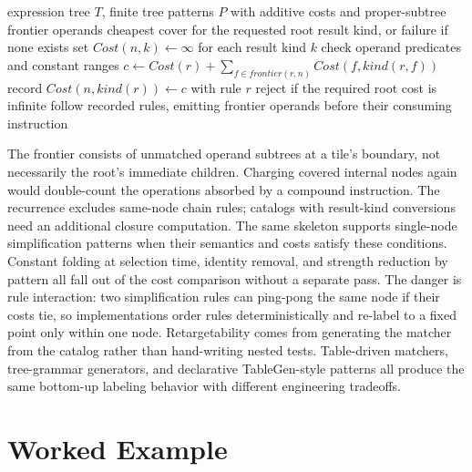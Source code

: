 \begin{algorithm}[htbp]
\caption{Tree-pattern instruction selection by dynamic programming}\label{alg:ch25-tree-dp}
\begin{pseudocode}
\Require expression tree $T$, finite tree patterns $P$ with additive costs and proper-subtree frontier operands
\Ensure cheapest cover for the requested root result kind, or failure if none exists
\State set $Cost(n, k) \gets \infty$ for each result kind $k$
\State check operand predicates and constant ranges
\State $c \gets Cost(r) + \sum_{f\in frontier(r,n)} Cost(f, kind(r,f))$
\State record $Cost(n, kind(r)) \gets c$ with rule $r$
\EndIf
\EndFor
\EndFor
\State reject if the required root cost is infinite
\State follow recorded rules, emitting frontier operands before their consuming instruction
\end{pseudocode}
\end{algorithm}

The frontier consists of unmatched operand subtrees at a tile's boundary, not necessarily the root's immediate children.
Charging covered internal nodes again would double-count the operations absorbed by a compound instruction.
The recurrence excludes same-node chain rules; catalogs with result-kind conversions need an additional closure computation.
The same skeleton supports single-node simplification patterns when their semantics and costs satisfy these conditions.
Constant folding at selection time, identity removal, and strength reduction by pattern all fall out of the cost comparison without a separate pass.
The danger is rule interaction: two simplification rules can ping-pong the same node if their costs tie, so implementations order rules deterministically and re-label to a fixed point only within one node.
Retargetability comes from generating the matcher from the catalog rather than hand-writing nested tests.
Table-driven matchers, tree-grammar generators, and declarative TableGen-style patterns all produce the same bottom-up labeling behavior with different engineering tradeoffs.

\section{Worked Example}\label{sec:ch25-worked}

